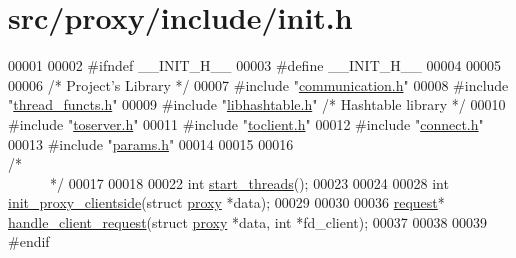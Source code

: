 \hypertarget{init_8h_source}{
\section{src/proxy/include/init.h}
}

\begin{DoxyCode}
00001 
00002 \textcolor{preprocessor}{#ifndef         \_\_INIT\_H\_\_}
00003 \textcolor{preprocessor}{}\textcolor{preprocessor}{#define         \_\_INIT\_H\_\_}
00004 \textcolor{preprocessor}{}
00005 
00006 \textcolor{comment}{/*      Project's Library       */}
00007 \textcolor{preprocessor}{#include        "\hyperlink{communication_8h}{communication.h}"}
00008 \textcolor{preprocessor}{#include        "\hyperlink{thread__functs_8h}{thread_functs.h}"}
00009 \textcolor{preprocessor}{#include        "\hyperlink{proxy_2include_2libhashtable_8h}{libhashtable.h}"}        \textcolor{comment}{/*      Hashtable library       */}
00010 \textcolor{preprocessor}{#include        "\hyperlink{toserver_8h}{toserver.h}"}
00011 \textcolor{preprocessor}{#include        "\hyperlink{toclient_8h}{toclient.h}"}
00012 \textcolor{preprocessor}{#include        "\hyperlink{connect_8h}{connect.h}"}
00013 \textcolor{preprocessor}{#include        "\hyperlink{params_8h}{params.h}"}
00014 
00015 
00016 \textcolor{comment}{/*~~~~~~~~~~~~~~~~~~~~~~~~~~~~~~~~~~~~~~~~~~~~~~~~~~~~~~~~~~~~~~~~~~~~~~~~~~~~*/}
00017 
00018  
00022 \textcolor{keywordtype}{int}             \hyperlink{init_8h_a2792453fa573cc47bd31ec5819f9e4a2}{start_threads}();
00023 
00024 
00028 \textcolor{keywordtype}{int}             \hyperlink{init_8h_a052406d1b8bd2fa2e16d47217715cb26}{init_proxy_clientside}(\textcolor{keyword}{struct} \hyperlink{structproxy}{proxy} *data);
00029 
00030 
00036 \hyperlink{structrequest}{request}* \hyperlink{init_8h_acdbcb452c1f2df74330d228549269ea7}{handle_client_request}(\textcolor{keyword}{struct} \hyperlink{structproxy}{proxy} *data, \textcolor{keywordtype}{int} *fd\_client);
00037 
00038 
00039 \textcolor{preprocessor}{#endif}
\end{DoxyCode}
